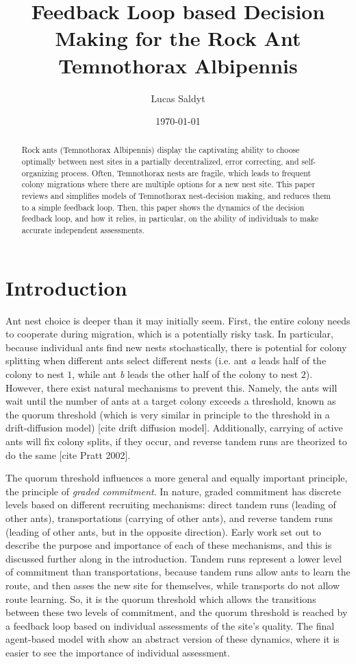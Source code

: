 \documentclass{article}
\title{Feedback Loop based Decision Making for the Rock Ant Temnothorax Albipennis}
\date{\today}
\author{Lucas Saldyt}
\begin{document}
\maketitle

\begin{abstract}
    Rock ants (Temnothorax Albipennis) display the captivating ability to choose optimally between nest sites in a partially decentralized, error correcting, and self-organizing process.
    Often, Temnothorax nests are fragile, which leads to frequent colony migrations where there are multiple options for a new nest site.
    This paper reviews and simplifies models of Temnothorax nest-decision making, and reduces them to a simple feedback loop.
    Then, this paper shows the dynamics of the decision feedback loop, and how it relies, in particular, on the ability of individuals to make accurate independent assessments.
\end{abstract}

\section{Introduction}


Ant nest choice is deeper than it may initially seem.
First, the entire colony needs to cooperate during migration, which is a potentially risky task.
In particular, because individual ants find new nests stochastically, there is potential for colony splitting when different ants select different nests (i.e. ant \emph{a} leads half of the colony to nest $1$, while ant \emph{b} leads the other half of the colony to nest $2$).
However, there exist natural mechanisms to prevent this.
Namely, the ants will wait until the number of ants at a target colony exceeds a threshold, known as the quorum threshold (which is very similar in principle to the threshold in a drift-diffusion model) [cite drift diffusion model].
Additionally, carrying of active ants will fix colony splits, if they occur, and reverse tandem runs are theorized to do the same [cite Pratt 2002]. 

The quorum threshold influences a more general and equally important principle, the principle of \emph{graded commitment}.
In nature, graded commitment has discrete levels based on different recruiting mechanisms: direct tandem runs (leading of other ants), transportations (carrying of other ants), and reverse tandem runs (leading of other ants, but in the opposite direction). 
Early work set out to describe the purpose and importance of each of these mechanisms, and this is discussed further along in the introduction.
Tandem runs represent a lower level of commitment than transportations, because tandem runs allow ants to learn the route, and then asses the new site for themselves, while transports do not allow route learning.
So, it is the quorum threshold which allows the transitions between these two levels of commitment, and the quorum threshold is reached by a feedback loop based on individual assessments of the site's quality. The final agent-based model with show an abstract version of these dynamics, where it is easier to see the importance of individual assessment.
\end{document}
